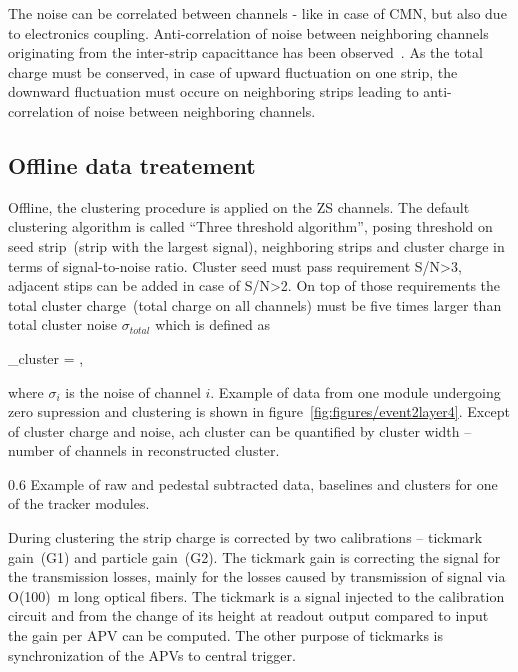 The noise can be correlated between channels - like in case of CMN, but also due to electronics coupling. Anti-correlation of noise between neighboring channels originating from the inter-strip capacittance has been observed~\cite{Lutz:1987wd}. As the total charge must be conserved, in case of upward fluctuation on one strip, the downward fluctuation must occure on neighboring strips leading to anti-correlation of noise between neighboring channels.

\subsection{Offline data treatement}


Offline, the clustering procedure is applied on the ZS channels. The default clustering algorithm is called ``Three threshold algorithm'', posing threshold on seed strip~(strip with the largest signal), neighboring strips and cluster charge in terms of signal-to-noise ratio. Cluster seed must pass requirement S/N>3, adjacent stips can be added in case of S/N>2. On top of those requirements the total cluster charge~(total charge on all channels) must be five times larger than total cluster noise $\sigma_{total}$ which is defined as

{
    \sigma_{cluster} = ,
}

where $\sigma_{i}$ is the noise of channel $i$. Example of data from one module undergoing zero supression and clustering is shown in figure~\ref{fig:figures/event2layer4}. Except of cluster charge and noise, ach cluster can be quantified by cluster width -- number of channels in reconstructed cluster.

                 {0.6}       %
                 {Example of raw and pedestal subtracted data, baselines and clusters for one of the tracker modules.} %

During clustering the strip charge is corrected by two calibrations -- tickmark gain~(G1) and particle gain~(G2). The tickmark gain is correcting the signal for the transmission losses, mainly for the losses caused by transmission of signal via O(100)~m long optical fibers. The tickmark is a signal injected to the calibration circuit and from the change of its height at readout output compared to input the gain per APV can be computed. The other purpose of tickmarks is synchronization of the APVs to central trigger.

